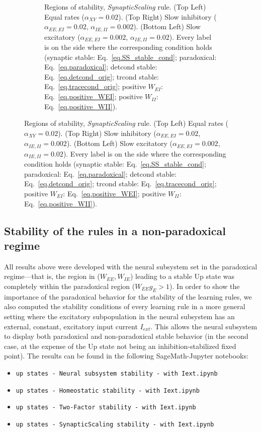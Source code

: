 \documentclass[
twocolumn,
]{article}
\newcommand{\EE}{\mathit{EE}}
\newcommand{\EI}{\mathit{EI}}
\newcommand{\IE}{\mathit{IE}}
\newcommand{\II}{\mathit{II}}
\newcommand{\XY}{\mathit{XY}}
\newcommand{\ext}{\mathit{ext}}
\begin{document}
\begin{figure}[!ht]
{\begin{figure}[H]
\caption{Regions of stability, {\em SynapticScaling} rule. (Top Left) Equal rates ($\alpha_{\XY}=0.02$). (Top Right) Slow inhibitory ($\alpha_{\EE,\EI}=0.02$, $\alpha_{\IE,\II}=0.002$). (Bottom Left) Slow excitatory ($\alpha_{\EE,\EI}=0.002$, $\alpha_{\IE,\II}=0.02$). Every label is on the side where the  corresponding  condition  holds (synaptic stable: Eq.\ \ref{eq.SS_stable_cond}; paradoxical: Eq.\ \ref{eq.paradoxical}; detcond stable: Eq.\ \ref{eq.detcond_orig}; trcond stable: Eq.\ \ref{eq.tracecond_orig}; positive $W_{\EI}$: Eq.\ \ref{eq.positive_WEI}; positive $W_{\II}$: Eq.\ \ref{eq.positive_WII}).}
\label{fig.SS_stability}
\end{figure}}
\end{figure}








\subsection{Stability of the rules in a non-paradoxical regime}
\label{sec.nonparadoxical}

All results above were developed with the neural subsystem set in the paradoxical regime---that is, the region in ($W_{\EE},W_{\IE}$) leading to a stable Up state was completely within the paradoxical region ($W_{\EE}g_E > 1$). In order to show the importance of the paradoxical behavior for the stability of the learning rules, we also computed the stability conditions of every learning rule in a more general setting where the excitatory subpopulation in the neural subsystem has an external, constant, excitatory input current $I_{\ext}$. This allows the neural subsystem to display both paradoxical and non-paradoxical stable behavior (in the second case, at the expense of the Up state not being an inhibition-stabilized fixed point). The results can be found in the following SageMath-Jupyter notebooks:
\begin{itemize}
\item[] {\tt up states - Neural subsystem stability - with Iext.ipynb}
\item[] {\tt up states - Homeostatic stability - with Iext.ipynb}
\item[] {\tt up states - Two-Factor stability - with Iext.ipynb}
\item[] {\tt up states - SynapticScaling stability - with Iext.ipynb}
\end{itemize}
\end{document}
